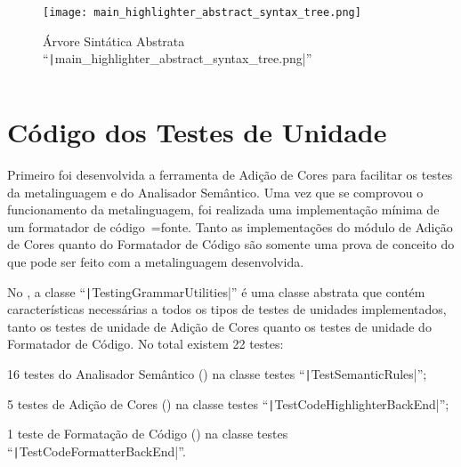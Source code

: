 \begin{figure}[!htb]
\caption[Árvore Sintática Abstrata ``main\_highlighter\_abstract\_syntax\_tree.png'']{Árvore Sintática Abstrata ``\texttt|main_highlighter_abstract_syntax_tree.png|''}
\label{figure:MainHighlighterAbstractSyntaxTree}
\centering
\texttt{[image: main\_highlighter\_abstract\_syntax\_tree.png]}
\end{figure}

\begin{code}
\caption[Resultado da execução do arquivo ``source/main\_highlighter.py'']{Resultado da execução do arquivo ``\texttt|source/main_highlighter.py|''}
\label{code:MainHighlighterPyResult}
\inputminted{text}{aftertext/main_highlighter_output.txt}
\end{code}


\chapter[Testes de Unidade]{Código dos Testes de Unidade}

Primeiro foi desenvolvida a ferramenta de Adição de Cores para facilitar os testes da metalinguagem e
do Analisador Semântico.
Uma vez que se comprovou o funcionamento da metalinguagem,
foi realizada uma implementação mínima de um formatador de código~=fonte.
Tanto as implementações do módulo de Adição de Cores quanto do Formatador de Código são somente uma prova de conceito do que pode ser feito com a metalinguagem desenvolvida.

No ,
a classe ``\texttt|TestingGrammarUtilities|'' é uma classe abstrata \cite{understandingDataAbstraction} que contém características necessárias a todos os tipos de testes de unidades implementados,
tanto os testes de unidade de Adição de Cores quanto os testes de unidade do Formatador de Código.
No total existem 22 testes:
\begin{inparaenum}[i)]
\item 16 testes do Analisador Semântico () na classe testes ``\texttt|TestSemanticRules|'';
\item 5 testes de Adição de Cores () na classe testes ``\texttt|TestCodeHighlighterBackEnd|'';
\item 1 teste de Formatação de Código () na classe testes ``\texttt|TestCodeFormatterBackEnd|''.
\end{inparaenum}%


